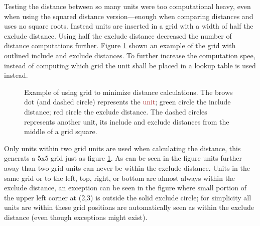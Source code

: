 Testing the distance between so many units were too computational heavy, even when using the squared distance version—enough when comparing distances and uses no square roots. Instead units are inserted in a grid with a width of half the exclude distance. Using half the exclude distance decreased the number of distance computations further. Figure \ref{fig:player_squad_group_grid} shown an example of the grid with outlined include and exclude distances. To further increase the computation spee, instead of computing which grid the unit shall be placed in a lookup table is used instead.

\begin{figure}[htb]
\centering
{}
\caption{Example of using grid to minimize distance calculations. The brows dot (and dashed circle) represents the \textcolor{Brown}{unit}; green circle the \textcolor{OliveGreen}{include distance}; red circle the \textcolor{BrickRed}{exclude distance}. The dashed circles represents another unit, its include and exclude distances from the middle of a grid square.}
\label{fig:player_squad_group_grid}
\end{figure}

Only units within two grid units are used when calculating the distance, this generats a 5x5 grid just as figure \ref{fig:player_squad_group_grid}. As can be seen in the figure units further away than two grid units can never be within the exclude distance. Units in the same grid or to the left, top, right, or bottom are almost always within the exclude distance, an exception can be seen in the figure where small portion of the upper left corner at (2,3) is outside the solid exclude circle; for simplicity all units are within these grid positions are automatically seen as within the exclude distance (even though exceptions might exist).

